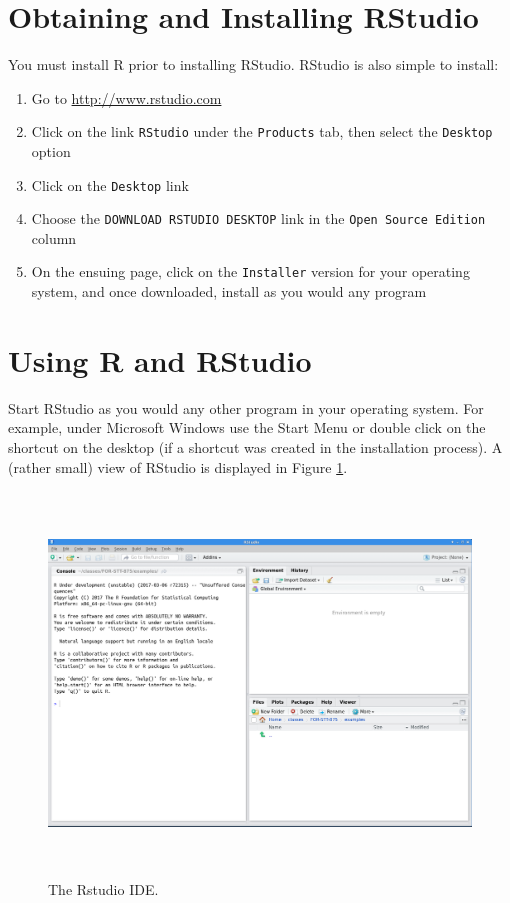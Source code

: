 \documentclass[]{krantz}
\providecommand{\tightlist}{%
  \setlength{\itemsep}{0pt}\setlength{\parskip}{0pt}}
\begin{document}
\hypertarget{obtaining-and-installing-rstudio}{%
\section{Obtaining and Installing RStudio}\label{obtaining-and-installing-rstudio}}

You must install R prior to installing RStudio. RStudio is also simple to install:

\begin{enumerate}
\def\labelenumi{\arabic{enumi}.}
\tightlist
\item
  Go to \url{http://www.rstudio.com}
\item
  Click on the link \texttt{RStudio} under the \texttt{Products} tab, then select the \texttt{Desktop} option
\item
  Click on the \texttt{Desktop} link
\item
  Choose the \texttt{DOWNLOAD\ RSTUDIO\ DESKTOP} link in the \texttt{Open\ Source\ Edition} column
\item
  On the ensuing page, click on the \texttt{Installer} version for your operating system, and once downloaded, install as you would any program
\end{enumerate}

\hypertarget{using-r-and-rstudio}{%
\section{Using R and RStudio}\label{using-r-and-rstudio}}

Start RStudio as you would any other program in your operating system. For example, under Microsoft Windows use the Start Menu or double click on the shortcut on the desktop (if a shortcut was created in the installation process). A (rather small) view of RStudio is displayed in Figure \ref{fig:rstudio}.

\begin{figure}
\includegraphics[width=20.75in,height=4in]{02-introToR/02-images/RStudio} \caption{The Rstudio IDE.}\label{fig:rstudio}
\end{figure}
\end{document}
